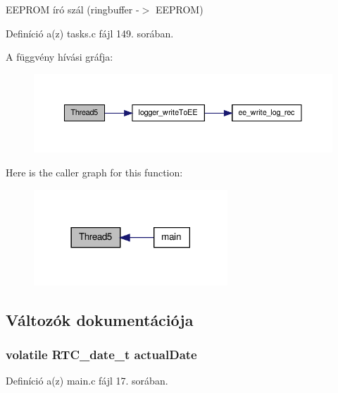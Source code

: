 E\-E\-P\-R\-O\-M író szál (ringbuffer -\/$>$ E\-E\-P\-R\-O\-M) 



Definíció a(z) tasks.\-c fájl 149. sorában.



A függvény hívási gráfja\-:
\nopagebreak
\begin{figure}[H]
\begin{center}
\leavevmode
\includegraphics[width=350pt]{tasks_8c_aad01c280ed05ea63627f5518167c5003_cgraph}
\end{center}
\end{figure}




Here is the caller graph for this function\-:
\nopagebreak
\begin{figure}[H]
\begin{center}
\leavevmode
\includegraphics[width=206pt]{tasks_8c_aad01c280ed05ea63627f5518167c5003_icgraph}
\end{center}
\end{figure}




\subsection{Változók dokumentációja}
\subsubsection[{actual\-Date}]{\setlength{\rightskip}{0pt plus 5cm}volatile R\-T\-C\-\_\-date\-\_\-t actual\-Date}\label{tasks_8c_a1fcf2a74e06883fb690c0c062bf9408c}


Definíció a(z) main.\-c fájl 17. sorában.

